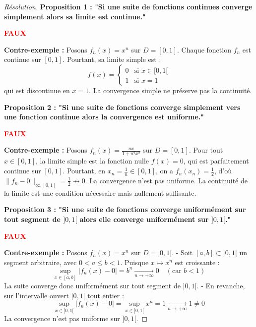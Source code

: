 \documentclass[12pt,a4paper]{report}
\begin{document}
\begin{proof}[Résolution]
\textbf{Proposition 1 : "Si une suite de fonctions continues converge simplement alors sa limite est continue."}
\begin{center}
\textbf{\textcolor{red}{FAUX}}
\end{center}
\textbf{Contre-exemple :} Posons $f_n(x) = x^n$ sur $D = [0, 1]$.
Chaque fonction $f_n$ est continue sur $[0, 1]$. Pourtant, sa limite simple est :
\[ f(x) = \begin{cases} 0 & \text{si } x \in [0, 1[ \\ 1 & \text{si } x = 1 \end{cases} \]
qui est discontinue en $x = 1$. La convergence simple ne préserve pas la continuité.

\vspace{0.3cm}
\textbf{Proposition 2 : "Si une suite de fonctions converge simplement vers une fonction continue alors la convergence est uniforme."}
\begin{center}
\textbf{\textcolor{red}{FAUX}}
\end{center}
\textbf{Contre-exemple :} Posons $f_n(x) = \frac{nx}{1 + n^2 x^2}$ sur $D = [0, 1]$.
Pour tout $x \in [0, 1]$, la limite simple est la fonction nulle $f(x) = 0$, qui est parfaitement continue sur $[0, 1]$.
Pourtant, en $x_n = \frac{1}{n} \in [0, 1]$, on a $f_n(x_n) = \frac{1}{2}$, d'où $\|f_n - 0\|_{\infty, [0, 1]} = \frac{1}{2} \not\to 0$.
La convergence n'est pas uniforme. La continuité de la limite est une condition nécessaire mais nullement suffisante.

\vspace{0.3cm}
\textbf{Proposition 3 : "Si une suite de fonctions converge uniformément sur tout segment de $]0, 1[$ alors elle converge uniformément sur $]0, 1[$."}
\begin{center}
\textbf{\textcolor{red}{FAUX}}
\end{center}
\textbf{Contre-exemple :} Posons $f_n(x) = x^n$ sur $D = ]0, 1[$.
- Soit $[a, b] \subset ]0, 1[$ un segment arbitraire, avec $0 < a \le b < 1$. Puisque $x \mapsto x^n$ est croissante :
\[ \sup_{x \in [a, b]} |f_n(x) - 0| = b^n \xrightarrow[n \to +\infty]{} 0 \quad (\text{car } b < 1) \]
La suite converge donc uniformément sur tout segment de $]0, 1[$.
- En revanche, sur l'intervalle ouvert $]0, 1[$ tout entier :
\[ \sup_{x \in ]0, 1[} |f_n(x) - 0| = \sup_{x \in ]0, 1[} x^n = 1 \xrightarrow[n \to +\infty]{} 1 \neq 0 \]
La convergence n'est pas uniforme sur $]0, 1[$.


\end{proof}
\end{document}
